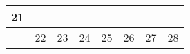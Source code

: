 {\begin{tabularx}{\linewidth}{|l!{\vrule width \myLenLineThicknessThick}*{7}{@{}X@{}|}}
      
      
        \begin{minipage}[t]{6mm}\centering{}21\end{minipage}
      
      
        \\  \hline 
      
    
  
  
  
  \hyperlink{week-2027-8}{} &
    
      
      
        \begin{minipage}[t]{6mm}\centering{}22\end{minipage}
      
       & 
    
      
      
        \begin{minipage}[t]{6mm}\centering{}23\end{minipage}
      
       & 
    
      
      
        \begin{minipage}[t]{6mm}\centering{}24\end{minipage}
      
       & 
    
      
      
        \begin{minipage}[t]{6mm}\centering{}25\end{minipage}
      
       & 
    
      
      
        \begin{minipage}[t]{6mm}\centering{}26\end{minipage}
      
       & 
    
      
      
        \begin{minipage}[t]{6mm}\centering{}27\end{minipage}
      
       & 
    
      
      
        \begin{minipage}[t]{6mm}\centering{}28\end{minipage}
      
      
        \\  \hline 
      
    
  
  
  \end{tabularx}
}
